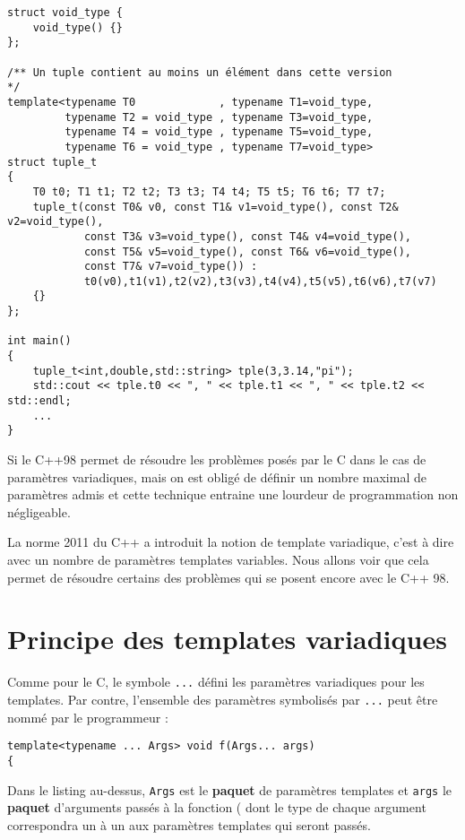 \documentclass[a4]{article}
\begin{document}
\begin{lstlisting}
struct void_type {
    void_type() {}
};

/** Un tuple contient au moins un élément dans cette version
*/
template<typename T0             , typename T1=void_type, 
         typename T2 = void_type , typename T3=void_type,
         typename T4 = void_type , typename T5=void_type, 
         typename T6 = void_type , typename T7=void_type>
struct tuple_t
{
    T0 t0; T1 t1; T2 t2; T3 t3; T4 t4; T5 t5; T6 t6; T7 t7;
    tuple_t(const T0& v0, const T1& v1=void_type(), const T2& v2=void_type(), 
            const T3& v3=void_type(), const T4& v4=void_type(), 
            const T5& v5=void_type(), const T6& v6=void_type(), 
            const T7& v7=void_type()) :
            t0(v0),t1(v1),t2(v2),t3(v3),t4(v4),t5(v5),t6(v6),t7(v7)
    {}
};    

int main()
{
    tuple_t<int,double,std::string> tple(3,3.14,"pi");
    std::cout << tple.t0 << ", " << tple.t1 << ", " << tple.t2 << std::endl;
    ...
}
\end{lstlisting}

Si le C++98 permet de résoudre les problèmes posés par le C dans le cas de paramètres variadiques, mais on est obligé de définir un
nombre maximal de paramètres admis et cette technique entraine une lourdeur de programmation non négligeable.

La norme 2011 du C++ a introduit la notion de template variadique, c'est à dire avec un nombre de paramètres templates variables. Nous allons
voir que cela permet de résoudre certains des problèmes qui se posent encore avec le C++ 98.

\section{Principe des templates variadiques}

Comme pour le C, le symbole \lstinline$...$ défini les paramètres variadiques pour les templates. Par contre, l'ensemble des paramètres symbolisés par \lstinline$...$ peut être nommé par le programmeur :

\begin{lstlisting}
template<typename ... Args> void f(Args... args)
{
\end{lstlisting}

Dans le listing au-dessus, \verb$Args$ est le \textbf{paquet} de paramètres templates et \verb$args$ le \textbf{paquet} d'arguments passés
à la fonction ( dont le type de chaque argument correspondra un à un aux paramètres templates qui seront passés.
\end{document}
